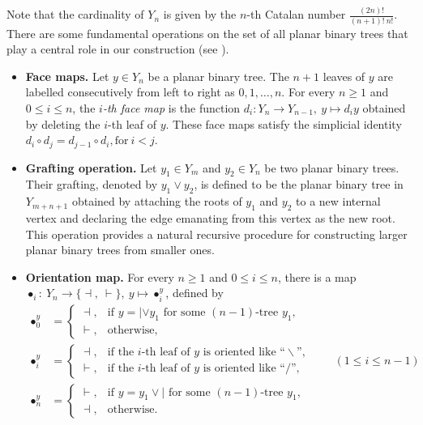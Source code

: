 \documentclass[a4paper,reqno,10pt]{amsart}
\theoremstyle{plain}
\theoremstyle{definition}
\theoremstyle{remark}
\begin{document}
\noindent Note that the cardinality of $Y_{n}$ is given by the $n$-th Catalan number $\frac{(2n)!}{(n+1)!~ n!}$. There are some fundamental operations on the set of all planar binary trees that play a central role in our construction (see \cite{Frabetti,loday1,maj-muk}).
\begin{itemize}
    \item[(i)] {\bf Face maps.} Let $y \in Y_n$ be a planar binary tree. The $n+1$ leaves of $y$ are labelled consecutively from left to right as $0, 1, \ldots, n$. For every $n \geq 1$ and $0 \leq i \leq n$, the {\em $i$-th face map} is the function $d_{i}: Y_{n} \to Y_{n-1},~ y \mapsto d_{i}y$ obtained by deleting the $i$-th leaf of $y$. These face maps satisfy the simplicial identity $d_{i} \circ d_{j} = d_{j-1} \circ d_{i}, \mathrm{ for~} i < j$.
    
    \item[(ii)] {\bf Grafting operation.} Let $y_{1}\in Y_{m}$ and $y_{2}\in Y_{n}$ be two planar binary trees. Their grafting, denoted by $y_{1} \vee y_{2}$, is defined to be the planar binary tree in $Y_{m+n+1}$ obtained by attaching the roots of $y_{1}$ and $y_{2}$ to a new internal vertex and declaring the edge emanating from this vertex as the new root. This operation provides a natural recursive procedure for constructing larger planar binary trees from smaller ones.
    
    \item[(iii)] {\bf Orientation map.} For every $n \geq 1$ and $0 \leq i \leq n$, there is a map $\bullet_{i}:~Y_{n}\to  \{\dashv, ~ \! \vdash\},~ \! y \mapsto \bullet_{i}^{y}$, defined by
    \begin{align*}
\bullet_0^y
&=
\begin{cases}
\dashv, & \text{if } y = | \vee y_1 \text{ for some } (n-1)\text{-tree } y_1,\\
\vdash, & \text{otherwise},
\end{cases}
\\[2ex]
\bullet_i^y
&=
\begin{cases}
\dashv, & \text{if the } i\text{-th leaf of } y \text{ is oriented like ``}\backslash\text{''},\\
\vdash, & \text{if the } i\text{-th leaf of } y \text{ is oriented like ``/''},
\end{cases}
\qquad (1\le i\le n-1)
\\[2ex]
\bullet_n^y
&=
\begin{cases}
\vdash, & \text{if } y = y_1 \vee | \text{ for some } (n-1)\text{-tree } y_1,\\
\dashv, & \text{otherwise}.
\end{cases}
\end{align*}
    

\end{itemize}
\end{document}

